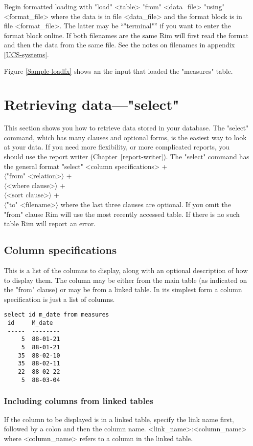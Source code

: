 \documentclass[11pt,a4paper]{report}
\def\opt#1{$\langle \mbox{#1} \rangle$}
\def\I{\index}
\begin{document}
Begin formatted loading with
"load" <table> "from" <data\_file> "using" <format\_file>
where the data is in file <data\_file> and the format block
is in file <format\_file>. The latter may be ``"terminal"''
if you want to enter the format block online.
If both filenames are the same Rim will first read the
format and then the data from the same file.
See the notes on filenames in appendix \ref{UCS-systems}.
 
Figure \ref{Sample-loadfx} shows an the input that loaded
the "measures" table.
\I{load@"load"|)}
 
 
\section{Retrieving data---"select"}
%
\I{select@"select"|}
This section shows you how to retrieve data stored in
your database.
The "select" command, which has many clauses and optional forms,
is the easiest way to look at your data.
If you need more flexibility, or more complicated reports,
you should use the report writer (Chapter~\ref{report-writer}).
The "select" command has the general format
"select" <column specifications> + \\
  \qquad \opt{"from" <relation>} + \\
  \qquad \opt{<where clause>} + \\
  \qquad \opt{<sort clause>} + \\
  \qquad \opt{"to" <filename>}
where the last three clauses are optional.
If you omit the "from" clause Rim will use the most recently
accessed table.  If there is no such table
Rim will report an error.
 
\subsection{Column specifications}
%
This is a list of the columns to display, along with an optional
description of how to display them.  The column may be either
from the main table (as indicated on the "from" clause) or may
be from a linked\I{link} table.
In its simplest form a column specification is just a list of columns.
 

\begin{verbatim}
select id m_date from measures
 id     M_date
 -----  --------
     5  88-01-21
     5  88-01-21
    35  88-02-10
    35  88-02-11
    22  88-02-22
     5  88-03-04
\end{verbatim}
 
\subsubsection{Including columns from linked tables}
%
\I{link}
If the column to be displayed is in a linked table, specify
the link name first, followed by a colon and then the column name.
<link\_name>:<column\_name>
where <column\_name> refers to a column in the linked table.
 
\end{document}

